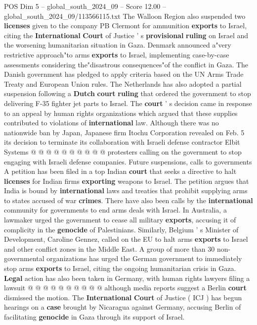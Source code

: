 \begin{textsample}{POS Dim 5 – global\_south\_2024\_09 – Score 12.00 – global\_south\_2024\_09/113566115.txt}
The Walloon Region also suspended two \textbf{licenses} given to the company PB Clermont for ammunition \textbf{exports} to Israel, citing the \textbf{International} \textbf{Court} of Justice ' s \textbf{provisional} \textbf{ruling} on Israel and the worsening humanitarian situation in Gaza.
Denmark announced a"very restrictive approach"to arms \textbf{exports} to Israel, implementing case-by-case assessments considering the"disastrous consequences"of the conflict in Gaza.
The Danish government has pledged to apply criteria based on the UN Arms Trade Treaty and European Union rules.
The Netherlands has also adopted a partial suspension following a \textbf{Dutch} \textbf{court} \textbf{ruling} that ordered the government to stop delivering F-35 fighter jet parts to Israel.
The \textbf{court} ' s decision came in response to an appeal by human rights organizations which argued that these supplies contributed to violations of \textbf{international} law.
Although there was no nationwide ban by Japan, Japanese firm Itochu Corporation revealed on Feb. 5 its decision to terminate its collaboration with Israeli defense contractor Elbit Systems @ @ @ @ @ @ @ @ @ @ protesters calling on the government to stop engaging with Israeli defense companies.
Future suspensions, calls to governments A petition has been filed in a top Indian \textbf{court} that seeks a directive to halt \textbf{licenses} for Indian firms \textbf{exporting} weapons to Israel.
The petition argues that India is bound by \textbf{international} laws and treaties that prohibit supplying arms to states accused of war \textbf{crimes}.
There have also been calls by the \textbf{international} community for governments to end arms deals with Israel.
In Australia, a lawmaker urged the government to cease all military \textbf{exports}, accusing it of complicity in the \textbf{genocide} of Palestinians.
Similarly, Belgium ' s Minister of Development, Caroline Gennez, called on the EU to halt arms \textbf{exports} to Israel and other conflict zones in the Middle East.
A group of more than 30 non-governmental organizations has urged the German government to immediately stop arms \textbf{exports} to Israel, citing the ongoing humanitarian crisis in Gaza. \textbf{Legal} action has also been taken in Germany, with human rights lawyers filing a lawsuit @ @ @ @ @ @ @ @ @ @ although media reports suggest a Berlin \textbf{court} dismissed the motion.
The \textbf{International} \textbf{Court} of Justice ( ICJ ) has begun hearings on a \textbf{case} brought by Nicaragua against Germany, accusing Berlin of facilitating \textbf{genocide} in Gaza through its support of Israel.

\end{textsample}
